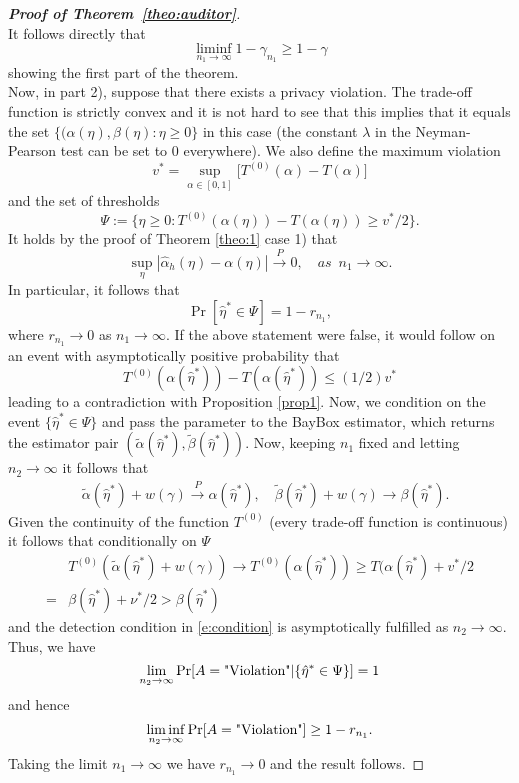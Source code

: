 \begin{proof}[\textbf{Proof of Theorem~\ref{theo:auditor}}]
\[\]
It follows directly that
\[
\liminf_{n_1 \to \infty} 1-\gamma_{n_1} \ge  1-\gamma
\]
showing the first part of the theorem.\\
Now, in part 2), suppose that there exists a privacy violation. The trade-off function is strictly convex and it is not hard to see that this implies that it equals the set $\{(\alpha(\eta), \beta(\eta): \eta \ge 0\}$ in this case (the constant $\lambda$ in the Neyman-Pearson test can be set to $0$ everywhere). We also define the maximum violation
\[
v^* = \sup_{\alpha \in [0,1]}\big[ T^{(0)}(\alpha)-T(\alpha)\big]
\]
and the set of thresholds
\[
\Psi:= \big\{\eta \ge 0:T^{(0)}(\alpha(\eta))-T(\alpha(\eta)) \ge  v^*/2\big\}.
\]
It holds by the proof of Theorem \ref{theo:1} case 1) that 
\[
\sup_\eta |\hat \alpha_h(\eta) - \alpha(\eta)|\overset{P}{\to} 0, \quad as \,\,\, n_1 \to \infty.
\]
In particular, it follows that
\[
\Pr[\hat \eta^* \in \Psi]= 1-r_{n_1},
\]
where $r_{n_1} \to 0$ as $n_1 \to \infty$.
If the above statement were false, it would follow on an event with asymptotically positive probability that 
\[
T^{(0)}(\alpha(\hat \eta^*))-T(\alpha(\hat \eta^*)) \le (1/2) v^*
\]
leading to a contradiction with Proposition \ref{prop1}. Now, we condition on the event $\{\hat \eta^* \in \Psi\}$ and pass the parameter to the BayBox estimator, which returns the estimator pair $(\tilde{\alpha}(\hat{\eta}^*), \tilde{\beta}(\hat{\eta}^*))$. Now, keeping $n_1$ fixed and letting $n_2 \to \infty$ it follows that
\begin{align*}
   & \tilde{\alpha}(\hat{\eta}^*) + w(\gamma) \overset{P}{\to} \alpha(\hat{\eta}^*), \quad  \tilde{\beta}(\hat{\eta}^*) + w(\gamma) \to \beta(\hat{\eta}^*).
\end{align*}
Given the continuity of the function $T^{(0)}$ (every trade-off function is continuous) it follows that conditionally on $\Psi$
\begin{align*}
&T^{(0)}(\tilde{\alpha}(\hat{\eta}^*) + w(\gamma)) \to T^{(0)}(\alpha(\hat{\eta}^*)) \ge T(\alpha(\hat{\eta}^*) +v^*/2\\
= &\beta(\hat{\eta}^*) +\nu^*/2>  \beta(\hat{\eta}^*)
\end{align*}
and the detection condition in \eqref{e:condition} is asymptotically fulfilled as $n_2 \to \infty$. Thus, we have 
\[
\lim_{n_2 \to \infty}\Pr[A = \textnormal{"Violation"}| \{\hat \eta^* \in \Psi\}]  =1
\] 
and hence
\[
\liminf_{n_2 \to \infty}\Pr[A = \textnormal{"Violation"}]\ge 1-r_{n_1}.
\]
Taking the limit $n_1 \to \infty$ we have $r_{n_1} \to 0$ and the result follows.
\end{proof}

